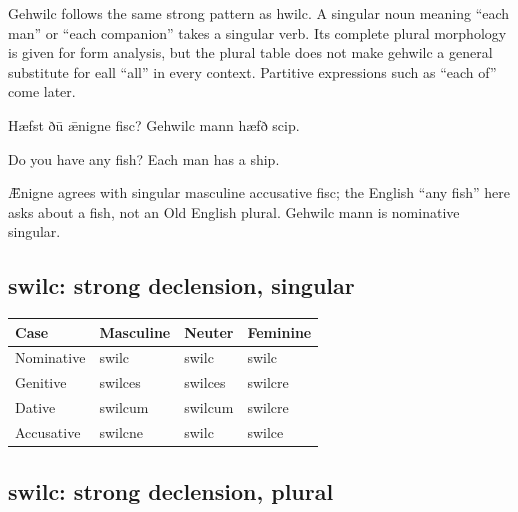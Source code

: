 Gehwilc follows the same strong pattern as hwilc. A singular noun meaning “each man” or “each companion” takes a singular verb. Its complete plural morphology is given for form analysis, but the plural table does not make gehwilc a general substitute for eall “all” in every context. Partitive expressions such as “each of” come later.

Hæfst ðū ǣnigne fisc? Gehwilc mann hæfð scip.

Do you have any fish? Each man has a ship.

Ǣnigne agrees with singular masculine accusative fisc; the English “any fish” here asks about a fish, not an Old English plural. Gehwilc mann is nominative singular.

\subsection*{swilc: strong declension, singular}

\par\begingroup
\fontsize{10.5}{13.2}\selectfont
\setlength{\LTleft}{0pt}\setlength{\LTright}{\fill}
\noindent
\begin{tabular}{@{}>{\raggedright\arraybackslash}p{28.89mm}>{\raggedright\arraybackslash}p{28.89mm}>{\raggedright\arraybackslash}p{28.89mm}>{\raggedright\arraybackslash}p{28.89mm}@{}}
\toprule
\textbf{Case} & \textbf{Masculine} & \textbf{Neuter} & \textbf{Feminine} \\
\midrule
Nominative & swilc & swilc & swilc \\
Genitive & swilces & swilces & swilcre \\
Dative & swilcum & swilcum & swilcre \\
Accusative & swilcne & swilc & swilce \\
\bottomrule
\end{tabular}
\par\endgroup

\subsection*{swilc: strong declension, plural}

